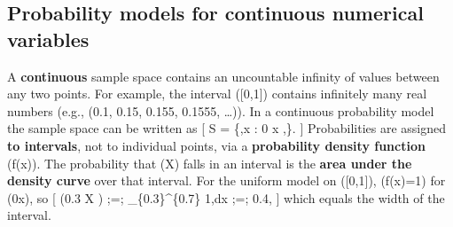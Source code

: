 \documentclass[
  letterpaper,
  DIV=11,
  numbers=noendperiod]{scrreprt}
\begin{document}
\subsection{Probability models for continuous numerical
variables}\label{probability-models-for-continuous-numerical-variables}

A \textbf{continuous} sample space contains an uncountable infinity of
values between any two points. For example, the interval ({[}0,1{]})
contains infinitely many real numbers (e.g., (0.1, 0.15, 0.155, 0.1555,
\ldots)). In a continuous probability model the sample space can be
written as {[} S = \{,x : 0 \le x ,\}. {]} Probabilities are
assigned \textbf{to intervals}, not to individual points, via a
\textbf{probability density function} (f(x)). The probability that (X)
falls in an interval is the \textbf{area under the density curve} over
that interval. For the uniform model on ({[}0,1{]}), (f(x)=1) for
(0\le x), so {[} \Pr(0.3 \le X ) ;=;
\int\_\{0.3\}\^{}\{0.7\} 1,dx ;=; 0.4, {]} which equals the width of the
interval.
\end{document}
